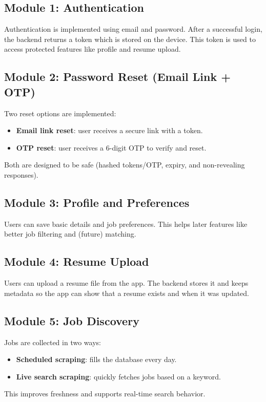 \documentclass[12pt,a4paper]{report}
\begin{document}
\subsection*{Module 1: Authentication}
\noindent
Authentication is implemented using email and password. After a successful login, the backend returns a token which is stored on the device. This token is used to access protected features like profile and resume upload.

\subsection*{Module 2: Password Reset (Email Link + OTP)}
\noindent
Two reset options are implemented:
\begin{itemize}[leftmargin=*, itemsep=4pt]
  \item \textbf{Email link reset}: user receives a secure link with a token.
  \item \textbf{OTP reset}: user receives a 6-digit OTP to verify and reset.
\end{itemize}
Both are designed to be safe (hashed tokens/OTP, expiry, and non-revealing responses).

\subsection*{Module 3: Profile and Preferences}
\noindent
Users can save basic details and job preferences. This helps later features like better job filtering and (future) matching.

\subsection*{Module 4: Resume Upload}
\noindent
Users can upload a resume file from the app. The backend stores it and keeps metadata so the app can show that a resume exists and when it was updated.

\subsection*{Module 5: Job Discovery}
\noindent
Jobs are collected in two ways:
\begin{itemize}[leftmargin=*, itemsep=4pt]
  \item \textbf{Scheduled scraping}: fills the database every day.
  \item \textbf{Live search scraping}: quickly fetches jobs based on a keyword.
\end{itemize}
This improves freshness and supports real-time search behavior.
\end{document}
